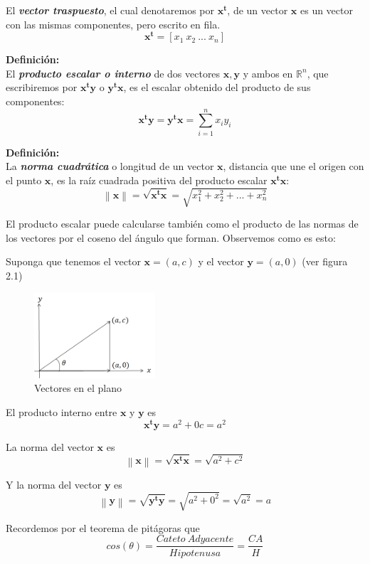 \documentclass[12pt,letterpaper]{report} %
\begin{document}
El \textit{\textbf{vector traspuesto}}, el cual denotaremos por $\mathbf{x^t}$, de un vector $\mathbf{x}$ es un vector con las mismas componentes, pero escrito en fila.
$$\mathbf{x^t}=[ x_1 \  x_2 \ ... \ x_n]$$

\textbf{Definición:} \\

El \textit{\textbf{producto escalar o interno}} de dos vectores $\mathbf{x},\mathbf{y}$ y ambos en $\mathbb{R}^n$, que escribiremos por $\mathbf{x^ty}$ o $\mathbf{y^tx}$, es el escalar obtenido del producto de sus componentes:
$$\mathbf{x^ty}=\mathbf{y^tx}=\displaystyle\sum_{i=1}^n x_i y_i$$

\textbf{Definición:} \\

La \textit{\textbf{norma cuadrática}} o longitud de un vector $\mathbf{x}$, distancia que une el origen con el punto $\mathbf{x}$, es la raíz cuadrada positiva del producto escalar $\mathbf{x^tx}$:
$$\left\| \mathbf{x} \right\|=\sqrt{\mathbf{x^tx}}=\sqrt{x_1^2+x_2^2+...+x_n^2}$$

El producto escalar puede calcularse también como el producto de las normas de los vectores por el coseno del ángulo que forman. Observemos como es esto:

Suponga que tenemos el vector $\mathbf{x}=(a,c)$ y el vector $\mathbf{y}=(a,0)$ (ver figura 2.1)\\

\begin{figure}
	\caption{Vectores en el plano}
	\centering
	\includegraphics[width=0.4\textwidth]{img/producescal.png}
\end{figure}

El producto interno entre $\mathbf{x}$ y $\mathbf{y}$ es $$\mathbf{x^ty}=a^2+ 0c=a^2$$

La norma del vector $\mathbf{x}$ es $$\left\| \mathbf{x} \right\|=\sqrt{\mathbf{x^tx}}=\sqrt{a^2+c^2}$$

Y la norma del vector $\mathbf{y}$ es $$\left\| \mathbf{y} \right\|=\sqrt{\mathbf{y^ty}}=\sqrt{a^2+0^2}=\sqrt{a^2}=a$$

Recordemos por el teorema de pitágoras que 
$$cos(\theta)=\frac{Cateto\ Adyacente}{Hipotenusa}=\frac{CA}{H}$$
\end{document}
